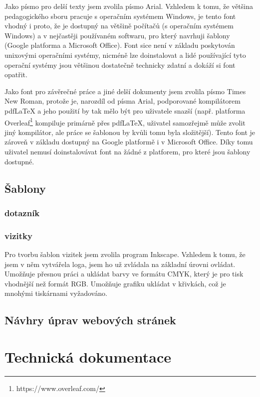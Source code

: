 \documentclass[11pt,a4paper,twoside,openright]{report}
\begin{document}
Jako písmo pro delší texty jsem zvolila písmo Arial. Vzhledem k tomu, že většina pedagogického sboru pracuje s operačním systémem Windows, je tento font vhodný i proto, že je dostupný na většině počítačů (s operačním systémem Windows) a v nejčastěji používaném softwaru, pro který navrhuji šablony (Google platforma a Microsoft Office). Font sice není v základu poskytován unixovými operačními systémy, nicméně lze doinstalovat a lidé používající tyto operační systémy jsou většinou dostatečně technicky zdatní a dokáží si font opatřit.

Jako font pro závěrečné práce a jiné delší dokumenty jsem zvolila písmo Times New Roman, protože je, narozdíl od písma Arial, podporované kompilátorem pdfLaTeX a jeho použití by tak mělo být pro uživatele snazší (např. platforma Overleaf\footnote{https://www.overleaf.com/} kompiluje primárně přes pdfLaTeX, uživatel samozřejmě může zvolit jiný kompilátor, ale práce se šablonou by kvůli tomu byla složitější). Tento font je zároveň v základu dostupný na Google platformě i v Microsoft Office. Díky tomu uživatel nemusí doinstalovávat font na žádné z platforem, pro které jsou šablony dostupné.

\section{Šablony}
\subsection{dotazník}
\subsection{vizitky}
Pro tvorbu šablon vizitek jsem zvolila program Inkscape. Vzhledem k tomu, že jsem v něm vytvářela loga, jsem ho už zvládala na základní úrovni ovládat. Umožňuje přesnou práci a ukládat barvy ve formátu CMYK, který je pro tisk vhodnější než formát RGB. Umožňuje grafiku ukládat v křivkách, což je mnohými tiskárnami vyžadováno.


\section{Návhry úprav webových stránek}


\chapter{Technická dokumentace}
\end{document}
